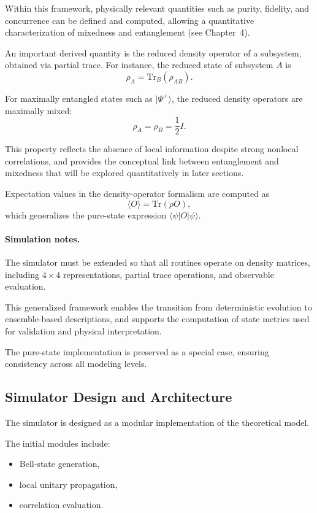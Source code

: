 \documentclass[a4paper]{article}
\begin{document}
Within this framework, physically relevant quantities such as purity, fidelity, and concurrence can be defined and computed, allowing a quantitative characterization of mixedness and entanglement (see Chapter~4).

An important derived quantity is the reduced density operator of a subsystem, obtained via partial trace. For instance, the reduced state of subsystem \(A\) is
\[
\rho_A = \mathrm{Tr}_B(\rho_{AB}).
\]

For maximally entangled states such as \( |\Psi^+\rangle \), the reduced density operators are maximally mixed:
\[
\rho_A = \rho_B = \frac{1}{2} I.
\]

This property reflects the absence of local information despite strong nonlocal correlations, and provides the conceptual link between entanglement and mixedness that will be explored quantitatively in later sections.

Expectation values in the density-operator formalism are computed as
\[
\langle O \rangle = \mathrm{Tr}(\rho O),
\]
which generalizes the pure-state expression \( \langle \psi | O | \psi \rangle \).

\paragraph{Simulation notes.}
The simulator must be extended so that all routines operate on density matrices, including \(4 \times 4\) representations, partial trace operations, and observable evaluation.

This generalized framework enables the transition from deterministic evolution to ensemble-based descriptions, and supports the computation of state metrics used for validation and physical interpretation.

The pure-state implementation is preserved as a special case, ensuring consistency across all modeling levels.

\subsection{Simulator Design and Architecture}

The simulator is designed as a modular implementation of the theoretical model.

The initial modules include:
\begin{itemize}
    \item Bell-state generation,
    \item local unitary propagation,
    \item correlation evaluation.
\end{itemize}
\end{document}
